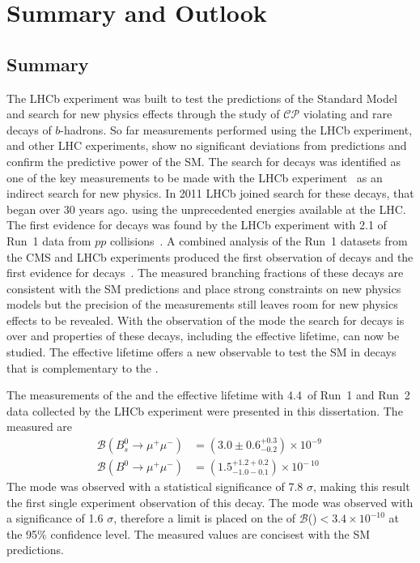 \chapter{Summary and Outlook}
\label{sec:summaryandoutlook}

\section{Summary}
The LHCb experiment was built to test the predictions of the Standard Model and search for new physics effects through the study of $\mathcal{CP}$ violating and rare decays of $b$-hadrons. So far measurements performed using the LHCb experiment, and other LHC experiments, show no significant deviations from predictions and confirm the predictive power of the SM. 
The search for \bmumu decays was identified as one of the key measurements to be made with the LHCb experiment~\cite{Adeva:2009ny} as an indirect search for new physics.
In 2011 LHCb joined search for these decays, that began over 30 years ago. using the unprecedented energies available at the LHC. The first evidence for \bsmumu decays was found by the LHCb experiment with 2.1 \fb of Run~1 data from $pp$ collisions~\cite{Aaij:2012nna}. A combined analysis of the Run~1 datasets from the CMS and LHCb experiments produced the first observation of \bsmumu decays and the first evidence for \bdmumu decays~\cite{CMS:2014xfa}. The measured branching fractions of these decays are consistent with the SM predictions and place strong constraints on new physics models but the precision of the measurements still leaves room for new physics effects to be revealed. With the observation of the \bs mode the search for \bsmumu decays is over and properties of these decays, including the effective lifetime, can now be studied. The effective lifetime offers a new observable to test the SM in \bsmumu decays that is complementary to the \BF. 

The measurements of the \bmumu \BF and the \bsmumu effective lifetime with 4.4~\fb of Run~1 and Run~2 data collected by the LHCb experiment were presented in this dissertation. The measured \BFs are
\begin{equation}
\begin{split}
  \mathcal{B}(B^{0}_{s} \to \mu^{+} \mu^{-}) &= (3.0 \pm 0.6^{+0.3}_{-0.2}) \times 10^{-9\
} \\
  \mathcal{B}(B^{0} \to \mu^{+} \mu^{-}) &= (1.5^{+1.2 +0.2}_{-1.0 -0.1})    \times 10^{-\
10}
\end{split}
\label{eq:BFresults2}
\end{equation}
The \bs mode was observed with a statistical significance of 7.8 $\sigma$, making this result the first single experiment observation of this decay. The \bd mode was observed with a significance of 1.6 $\sigma$, therefore a limit is placed on the \BF of $\mathcal{B}$(\bdmumu)$ < 3.4 \times 10^{-10}$ at the 95$\%$ confidence level. The measured values are concisest with the SM predictions. %


